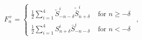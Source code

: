 \begin{equation}
F^+_n = \left\{  \begin{array}{ll} 
\frac{1}{2} \sum_{i=1}^4 
\tilde{S}_{-n-\delta}^i \tilde{\bar{S}}_{n+\delta}^i 
& \mbox{ for } n \geq -\delta \\
\frac{1}{2} \sum_{i=1}^4 
S_{n+\delta}^i \bar{S}_{-n-\delta}^i 
& \mbox{ for } n < -\delta
\end{array} \right. \ \ ,
\end{equation}

